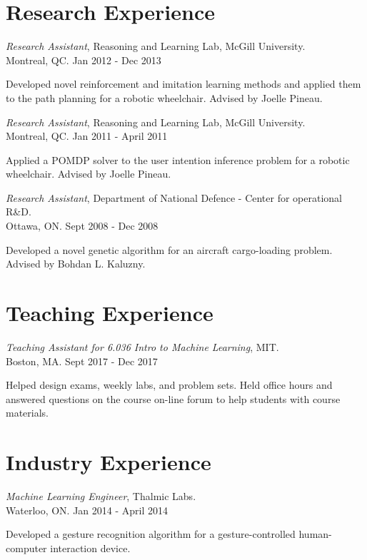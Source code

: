 \documentclass[line,margin,letterpaper]{res}
\begin{document}
\begin{resume}
\iffalse
\section{Research Experience}


{\sl Research Assistant}, Reasoning and Learning Lab, McGill University.
\\ \hfill Montreal, QC. Jan 2012 - Dec 2013
\begin{list}{}
\item Developed novel reinforcement and imitation learning methods and applied them to the path planning for a robotic wheelchair. Advised by Joelle Pineau.
\end{list}

{\sl Research Assistant}, Reasoning and Learning Lab, McGill University.
\\ \hfill Montreal, QC. Jan 2011 - April 2011
\begin{list}{}
\item Applied a POMDP solver to the user intention inference problem for a robotic wheelchair. Advised by Joelle Pineau.
\end{list}

{\sl Research Assistant}, Department of National Defence - Center for operational R\&D.
\\ \hfill Ottawa, ON. Sept 2008 - Dec 2008
\begin{list}{}
\item Developed a novel genetic algorithm for an aircraft cargo-loading problem.  Advised by Bohdan L. Kaluzny.
\end{list}

\section{Teaching Experience}
{\sl Teaching Assistant for 6.036 Intro to Machine Learning}, MIT.
\\ \hfill Boston, MA. Sept 2017 - Dec 2017
\begin{list}{}
\item  Helped design exams, weekly labs, and problem sets. Held office hours
and answered questions on the course on-line forum to help students with course
materials.
\end{list}
\section{Industry Experience}
{\sl Machine Learning Engineer}, Thalmic Labs.
\\ \hfill Waterloo, ON. Jan 2014 - April 2014
\begin{list}{}
\item  Developed a gesture recognition algorithm for a gesture-controlled human-computer interaction device.
\end{list}


\end{resume}
\end{document}

